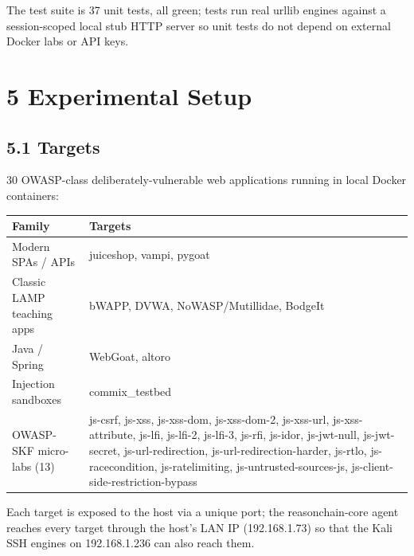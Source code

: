 \documentclass[
]{article}
\newcounter{none} %
\begin{document}
The test suite is 37 unit tests, all green; tests run real urllib
engines against a session-scoped local stub HTTP server so unit tests do
not depend on external Docker labs or API keys.

\section{5 Experimental Setup}\label{experimental-setup}

\subsection{5.1 Targets}\label{targets}

30 OWASP-class deliberately-vulnerable web applications running in local
Docker containers:

{\def\LTcaptype{none} %
\begin{longtable}[]{@{}
  >{\raggedright\arraybackslash}p{}
  >{\raggedright\arraybackslash}p{}@{}}
\toprule\noalign{}
\begin{minipage}[b]{\linewidth}\raggedright
Family
\end{minipage} & \begin{minipage}[b]{\linewidth}\raggedright
Targets
\end{minipage} \\
\midrule\noalign{}
\endhead
\bottomrule\noalign{}
\endlastfoot
Modern SPAs / APIs & juiceshop, vampi, pygoat \\
Classic LAMP teaching apps & bWAPP, DVWA, NoWASP/Mutillidae, BodgeIt \\
Java / Spring & WebGoat, altoro \\
Injection sandboxes & commix\_testbed \\
OWASP-SKF micro-labs (13) & js-csrf, js-xss, js-xss-dom, js-xss-dom-2,
js-xss-url, js-xss-attribute, js-lfi, js-lfi-2, js-lfi-3, js-rfi,
js-idor, js-jwt-null, js-jwt-secret, js-url-redirection,
js-url-redirection-harder, js-rtlo, js-racecondition, js-ratelimiting,
js-untrusted-sources-js, js-client-side-restriction-bypass \\
\end{longtable}
}

Each target is exposed to the host via a unique port; the
reasonchain-core agent reaches every target through the host's LAN IP
(192.168.1.73) so that the Kali SSH engines on 192.168.1.236 can also
reach them.
\end{document}

